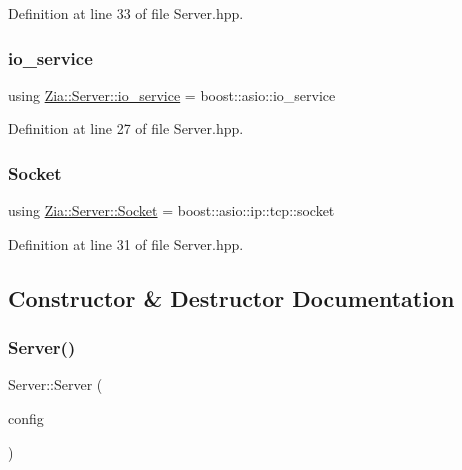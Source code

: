 Definition at line 33 of file Server.\+hpp.

\mbox{\label{class_zia_1_1_server_a624c715504f8bbf6b858081dabe26f9c}} 
\subsubsection{\texorpdfstring{io\+\_\+service}{io\_service}}
{\footnotesize\ttfamily using \hyperlink{class_zia_1_1_server_a624c715504f8bbf6b858081dabe26f9c}{Zia\+::\+Server\+::io\+\_\+service} =  boost\+::asio\+::io\+\_\+service}



Definition at line 27 of file Server.\+hpp.

\mbox{\label{class_zia_1_1_server_ae3a52a854f930c1daa7c8e510f7e37bd}} 
\subsubsection{\texorpdfstring{Socket}{Socket}}
{\footnotesize\ttfamily using \hyperlink{class_zia_1_1_server_ae3a52a854f930c1daa7c8e510f7e37bd}{Zia\+::\+Server\+::\+Socket} =  boost\+::asio\+::ip\+::tcp\+::socket}



Definition at line 31 of file Server.\+hpp.



\subsection{Constructor \& Destructor Documentation}
\mbox{\label{class_zia_1_1_server_a3f1591f28c6755b353d61e3a44d56b39}} 
\subsubsection{\texorpdfstring{Server()}{Server()}}
{\footnotesize\ttfamily Server\+::\+Server (\begin{DoxyParamCaption}\item[{const \hyperlink{class_zia_1_1_server_a10861064c5ac1dc97cc537023d67471d}{Config\+Ptr} \&}]{config }\end{DoxyParamCaption})}



